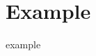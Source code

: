 \documentclass[12pt,fleqn,dvipdfmx]{jarticle}
\begin{document}
  \section{Example}
    example \cite{Example}

  \newpage
  \begin{thebibliography}{99}
  \end{thebibliography}

  
\end{document}
